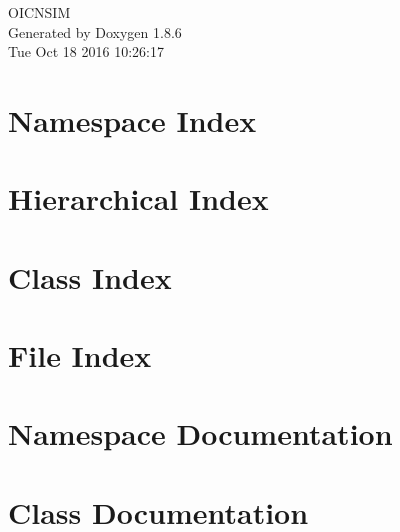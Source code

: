 \documentclass[twoside]{book}
\newcommand{\clearemptydoublepage}{%
  \newpage{\pagestyle{empty}\cleardoublepage}%
}
\begin{document}
\hypersetup{pageanchor=false}
\begin{titlepage}
\vspace*{7cm}
\begin{center}%
{\Large O\-I\-C\-N\-S\-I\-M }\\
\vspace*{1cm}
{\large Generated by Doxygen 1.8.6}\\
\vspace*{0.5cm}
{\small Tue Oct 18 2016 10:26:17}\\
\end{center}
\end{titlepage}
\clearemptydoublepage
\tableofcontents
\clearemptydoublepage
{}
\hypersetup{pageanchor=true}

\chapter{Namespace Index}

\chapter{Hierarchical Index}

\chapter{Class Index}

\chapter{File Index}

\chapter{Namespace Documentation}

\chapter{Class Documentation}




























\end{document}
